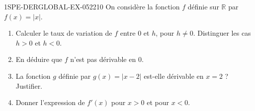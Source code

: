 \begin{exercice}{1SPE-DERGLOBAL-EX-052}{2}{10}
On considère la fonction $f$ définie sur $\mathbb{R}$ par $f(x) = |x|$.
\begin{enumerate}
  \item Calculer le taux de variation de $f$ entre $0$ et $h$, pour $h
\neq 0$. Distinguer les cas $h > 0$ et $h < 0$.
  \item En déduire que $f$ n'est pas dérivable en $0$.
  \item La fonction $g$ définie par $g(x) = |x - 2|$ est-elle dérivable en $x = 2$ ? Justifier.
  \item Donner l'expression de $f'(x)$ pour $x > 0$ et pour $x < 0$.
\end{enumerate}
\end{exercice}
